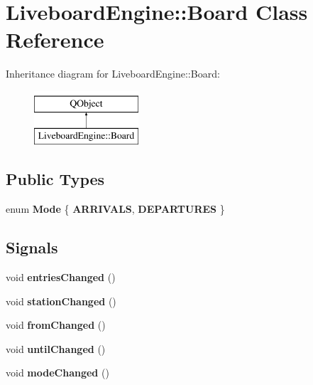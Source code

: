 \hypertarget{classLiveboardEngine_1_1Board}{}\section{Liveboard\+Engine\+:\+:Board Class Reference}
\label{classLiveboardEngine_1_1Board}
Inheritance diagram for Liveboard\+Engine\+:\+:Board\+:\begin{figure}[H]
\begin{center}
\leavevmode
\includegraphics[height=2.000000cm]{classLiveboardEngine_1_1Board}
\end{center}
\end{figure}
\subsection*{Public Types}
\begin{DoxyCompactItemize}
\item 
\mbox{\label{classLiveboardEngine_1_1Board_a40e707889f6ba898bc5628dbf251fcdf}} 
enum {\bfseries Mode} \{ {\bfseries A\+R\+R\+I\+V\+A\+LS}, 
{\bfseries D\+E\+P\+A\+R\+T\+U\+R\+ES}
 \}
\end{DoxyCompactItemize}
\subsection*{Signals}
\begin{DoxyCompactItemize}
\item 
\mbox{\label{classLiveboardEngine_1_1Board_a3730ecf6b49c607984cccac4a0ec8db0}} 
void {\bfseries entries\+Changed} ()
\item 
\mbox{\label{classLiveboardEngine_1_1Board_acfc6c7e16ad579dbc55e1a1a5189f016}} 
void {\bfseries station\+Changed} ()
\item 
\mbox{\label{classLiveboardEngine_1_1Board_a531c4cb3e17fda5a4f8144b9f75608cd}} 
void {\bfseries from\+Changed} ()
\item 
\mbox{\label{classLiveboardEngine_1_1Board_af1e8c4bf8a6ccc7f6a19b7c4f34d7ac1}} 
void {\bfseries until\+Changed} ()
\item 
\mbox{\label{classLiveboardEngine_1_1Board_addf2a9878bea4937fd1a5021437eef3d}} 
void {\bfseries mode\+Changed} ()
\end{DoxyCompactItemize}
